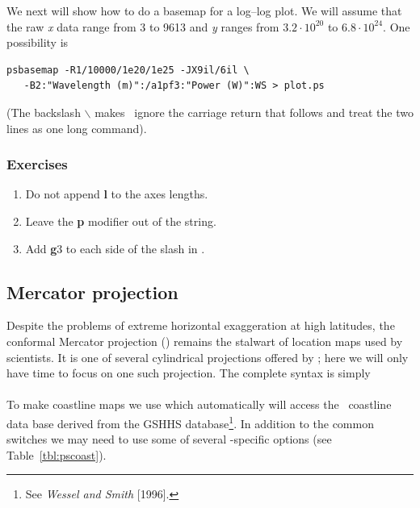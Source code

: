 \documentclass{report}
\begin{document}
We next will show how to do a basemap for a log--log plot.  We will
assume that the raw {\it x} data range from 3 to 9613 and {\it y}
ranges from $3.2 \cdot 10^{20}$ to $6.8 \cdot 10^{24}$.  One possibility is

{\small\begin{verbatim} 
psbasemap -R1/10000/1e20/1e25 -JX9il/6il \
   -B2:"Wavelength (m)":/a1pf3:"Power (W)":WS > plot.ps 
\end{verbatim}
}

\noindent
(The backslash $\backslash$ makes \UNIX\ ignore the carriage return that follows and treat the two lines as one long command).

\subsubsection{Exercises}

\begin{enumerate}

\item Do not append {\bf l} to the axes lengths.

\item Leave the {\bf p} modifier out of the  string.

\item Add {\bf g}3 to each side of the slash in .

\end{enumerate}

\subsection{Mercator projection}

Despite the problems of extreme horizontal exaggeration at high
latitudes, the conformal Mercator projection () remains
the stalwart of location maps used by scientists.  It is one
of several cylindrical projections offered by \GMT; here we
will only have time to focus on one such projection.  The
complete syntax is simply \\

 \\

To make coastline maps we use  which automatically will
access the \GMT\ coastline data base derived from the GSHHS
database\footnote{See {\it Wessel and Smith} [1996].}.  In addition
to the common switches we may need to use some of several 
-specific options (see Table~\ref{tbl:pscoast}).
\end{document}
